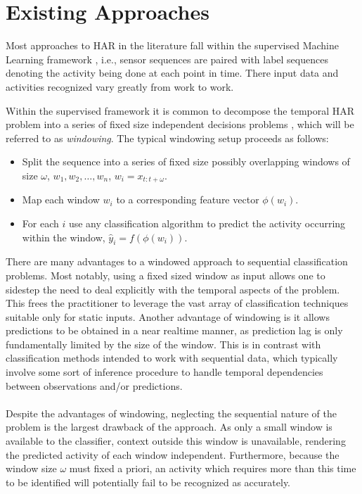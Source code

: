 \documentclass[12pt]{report}
\newcommand{\1}[0]{\mathbbm{1}}
\newcommand{\seq}[3]{\ensuremath{#1_{{#2}:{#3}}}}
\begin{document}
\section{Existing Approaches}
Most approaches to \ac{HAR} in the literature fall within the
supervised Machine Learning framework \cite{har-survey}, i.e.,
sensor sequences are paired with label sequences denoting the activity
being done at each point in time. There input data and activities recognized
vary greatly from work to work.

Within the supervised framework it is
common to decompose the temporal \ac{HAR} problem into a series of
fixed size independent decisions problems
\cite{assembly-activity}
\cite{tutorial-bulling}
\cite{phone-kwapisz},
which will be referred to as \emph{windowing}.
The typical windowing setup proceeds as follows:
\begin{itemize}
    \item Split the sequence into a series of fixed size possibly overlapping windows
          of size $\omega$, $w_1, w_2, \ldots, w_n$, $w_i = \seq{x}{t}{t + \omega}$.
    \item Map each window $w_i$ to a corresponding feature vector $\phi(w_i)$.
    \item For each $i$ use any classification algorithm to predict the activity occurring
          within the window, $\hat{y}_i = f(\phi(w_i))$.
\end{itemize}
There are many advantages to a windowed approach to sequential classification problems.
Most notably, using a fixed sized window as input allows one to sidestep the need to deal
explicitly with the temporal aspects of the problem. This frees the practitioner
to leverage the vast array of classification techniques suitable only for static
inputs. Another advantage of windowing is it allows predictions to be obtained in
a near realtime manner, as prediction lag is only fundamentally limited by the size
of the window. This is in contrast with classification methods intended to work with
sequential data, which typically involve some sort of inference procedure to handle
temporal dependencies between observations and/or predictions.
\\\\
Despite the advantages of windowing, neglecting the sequential nature of the problem
is the largest drawback of the approach. As only a small window is available
to the classifier, context outside this window is unavailable, rendering
the predicted activity of each window independent. Furthermore, because the
window size $\omega$ must fixed a priori, an activity which requires more than this time
to be identified will potentially fail to be recognized as accurately.
\end{document}
